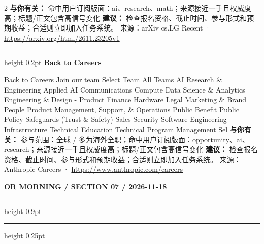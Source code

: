 \documentclass[10.5pt]{ctexart}
\begin{document}
\begin{multicols}{2}
\textbf{与你有关：} 命中用户订阅版面：ai、research、math；来源接近一手且权威度高；标题/正文包含高信号变化
\textbf{建议：} 检查报名资格、截止时间、参与形式和预期收益；合适则立即加入任务系统。
{\footnotesize\color{ormuted} 来源：arXiv cs.LG Recent · \url{https://arxiv.org/html/2611.23205v1}}
\vspace{2mm}
\hrule height 0.2pt
\vspace{2mm}
{\large\bfseries Back to Careers}\par
Back to Careers Join our team Select Team All Teams AI Research \& Engineering Applied AI Communications Compute Data Science \& Analytics Engineering \& Design - Product Finance Hardware Legal Marketing \& Brand People Product Management, Support, \& Operations Public Benefit Public Policy Safeguards (Trust \& Safety) Sales Security Software Engineering - Infrastructure Technical Education Technical Program Management Sel
\textbf{与你有关：} 参与范围：全球 / 多为海外全职；命中用户订阅版面：opportunity、ai、research；来源接近一手且权威度高；标题/正文包含高信号变化
\textbf{建议：} 检查报名资格、截止时间、参与形式和预期收益；合适则立即加入任务系统。
{\footnotesize\color{ormuted} 来源：Anthropic Careers · \url{https://www.anthropic.com/careers}}
\end{multicols}
\newpage
{\small\bfseries OR MORNING / SECTION 07 / 2026-11-18}
\vspace{2mm}
\hrule height 0.9pt
\vspace{1.5mm}
\hrule height 0.25pt
\vspace{4mm}
\end{document}
